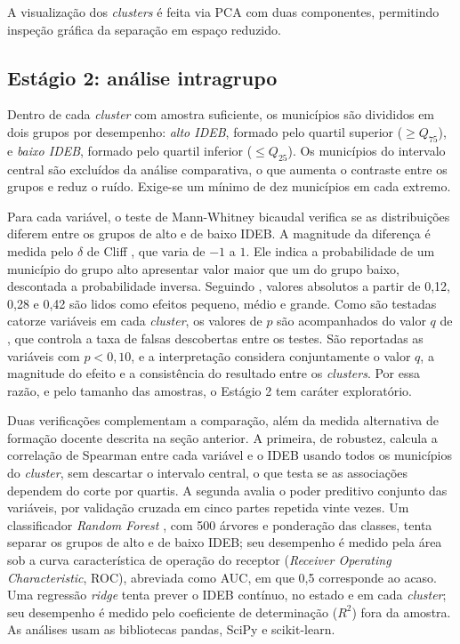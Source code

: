 A visualização dos \textit{clusters} é feita via PCA \citep{abdi2010} com duas componentes, permitindo inspeção gráfica da separação em espaço reduzido.

\subsection{Estágio 2: análise intragrupo}

Dentro de cada \textit{cluster} com amostra suficiente, os municípios são divididos em dois grupos por desempenho: \textit{alto IDEB}, formado pelo quartil superior ($\geq Q_{75}$), e \textit{baixo IDEB}, formado pelo quartil inferior ($\leq Q_{25}$). Os municípios do intervalo central são excluídos da análise comparativa, o que aumenta o contraste entre os grupos e reduz o ruído. Exige-se um mínimo de dez municípios em cada extremo.

Para cada variável, o teste de Mann-Whitney \citep{mannwhitney1947} bicaudal verifica se as distribuições diferem entre os grupos de alto e de baixo IDEB. A magnitude da diferença é medida pelo $\delta$ de Cliff \citep{cliff1993}, que varia de $-1$ a $1$. Ele indica a probabilidade de um município do grupo alto apresentar valor maior que um do grupo baixo, descontada a probabilidade inversa. Seguindo \citet{vargha2000}, valores absolutos a partir de 0,12, 0,28 e 0,42 são lidos como efeitos pequeno, médio e grande. Como são testadas catorze variáveis em cada \textit{cluster}, os valores de $p$ são acompanhados do valor $q$ de \citet{benjamini1995}, que controla a taxa de falsas descobertas entre os testes. São reportadas as variáveis com $p < 0{,}10$, e a interpretação considera conjuntamente o valor $q$, a magnitude do efeito e a consistência do resultado entre os \textit{clusters}. Por essa razão, e pelo tamanho das amostras, o Estágio 2 tem caráter exploratório.

Duas verificações complementam a comparação, além da medida alternativa de formação docente descrita na seção anterior. A primeira, de robustez, calcula a correlação de Spearman entre cada variável e o IDEB usando todos os municípios do \textit{cluster}, sem descartar o intervalo central, o que testa se as associações dependem do corte por quartis. A segunda avalia o poder preditivo conjunto das variáveis, por validação cruzada em cinco partes repetida vinte vezes. Um classificador \textit{Random Forest} \citep{breiman2001}, com 500 árvores e ponderação das classes, tenta separar os grupos de alto e de baixo IDEB; seu desempenho é medido pela área sob a curva característica de operação do receptor (\textit{Receiver Operating Characteristic}, ROC), abreviada como AUC, em que 0,5 corresponde ao acaso. Uma regressão \textit{ridge} \citep{hoerl1970} tenta prever o IDEB contínuo, no estado e em cada \textit{cluster}; seu desempenho é medido pelo coeficiente de determinação ($R^2$) fora da amostra. As análises usam as bibliotecas pandas, SciPy e scikit-learn.

